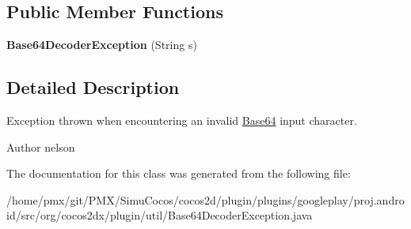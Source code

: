 \subsection*{Public Member Functions}
\begin{DoxyCompactItemize}
\item 
\mbox{\label{classorg_1_1cocos2dx_1_1plugin_1_1util_1_1Base64DecoderException_ab52439bdc141a93b6c33ed031d0a93ce}} 
{\bfseries Base64\+Decoder\+Exception} (String s)
\end{DoxyCompactItemize}


\subsection{Detailed Description}
Exception thrown when encountering an invalid \hyperlink{classorg_1_1cocos2dx_1_1plugin_1_1util_1_1Base64}{Base64} input character.

\begin{DoxyAuthor}{Author}
nelson 
\end{DoxyAuthor}


The documentation for this class was generated from the following file\+:\begin{DoxyCompactItemize}
\item 
/home/pmx/git/\+P\+M\+X/\+Simu\+Cocos/cocos2d/plugin/plugins/googleplay/proj.\+android/src/org/cocos2dx/plugin/util/Base64\+Decoder\+Exception.\+java\end{DoxyCompactItemize}
